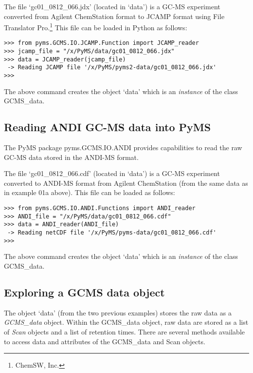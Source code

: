 The file `gc01\_0812\_066.jdx' (located in `data') is a GC-MS experiment
converted from Agilent ChemStation format to JCAMP format using File Translator
Pro.\footnote{ChemSW, Inc.} This file can be loaded in Python as follows:

\begin{verbatim}
>>> from pyms.GCMS.IO.JCAMP.Function import JCAMP_reader
>>> jcamp_file = "/x/PyMS/data/gc01_0812_066.jdx"
>>> data = JCAMP_reader(jcamp_file)
 -> Reading JCAMP file '/x/PyMS/pyms2-data/gc01_0812_066.jdx'
>>>
\end{verbatim}

\noindent
The above command creates the object `data' which is an {\em instance}
of the class GCMS\_data.

\subsection{Reading ANDI GC-MS data into PyMS}


The PyMS package pyms.GCMS.IO.ANDI provides capabilities to read the raw
GC-MS data stored in the ANDI-MS format.

The file `gc01\_0812\_066.cdf' (located in `data') is a GC-MS experiment
converted to ANDI-MS format from Agilent ChemStation (from the same data as in
example 01a above). This file can be loaded as follows:

\begin{verbatim}
>>> from pyms.GCMS.IO.ANDI.Functions import ANDI_reader
>>> ANDI_file = "/x/PyMS/data/gc01_0812_066.cdf"
>>> data = ANDI_reader(ANDI_file)
 -> Reading netCDF file '/x/PyMS/pyms-data/gc01_0812_066.cdf'
>>>
\end{verbatim}

\noindent
The above command creates the object `data' which is an {\em instance}
of the class GCMS_data.

\subsection{Exploring a GCMS data object}


The object `data' (from the two previous examples) stores the raw data as a {\em
GCMS\_data} object. Within the GCMS\_data object, raw data are stored as a list
of {\em Scan} objects and a list of retention times.  There are several methods
available to access data and attributes of the GCMS\_data and Scan objects.

